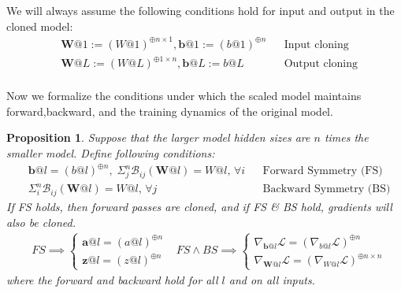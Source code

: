 \documentclass{article}
\newtheorem{proposition}{Proposition}
\newcommand{\1}{\mathbf{1}}
\newcommand{\Loss}{\mathcal{L}}
\newcommand{\R}[2]{\mathcal{R}_{#2}(#1)}
\renewcommand{\R}[2]{({#1})^{\oplus #2}}
\newcommand{\bl}[2]{\mathcal{B}_{#2}({#1})}
\newcommand{\B}[1]{\boldsymbol{#1}}
\begin{document}
We will always assume the following conditions hold for input and output in the cloned model:
\begin{align*}
    &\B W@1:=\R{W@1}{n\times 1},\B b@1:=\R{b@1}{ n} && \text{Input cloning} \\
    &\B W@L:= \R{W@L}{1\times n},\B b@L:=b@L && \text{Output cloning}\\
\end{align*}

Now we formalize the conditions under which the scaled model maintains forward,backward, and the training dynamics of the original model. 

\begin{proposition}\label{prop:cloning_forward_backward} 
    Suppose that the larger model hidden sizes are $n$ times the smaller model. Define following conditions:
    \begin{align*}
    &  \B b@l = \R{b@l}{ n},\; \Sigma_{j}^n\bl{\B W@l}{ij} = W@l,\, \forall i && \text{Forward Symmetry (FS)}\\
    &  \Sigma_{i}^n\bl{\B W@l}{ij} = W@l,\, \forall j  && \text{Backward Symmetry (BS)}
    \end{align*}
    If FS holds, then forward passes are cloned, and if FS \& BS hold, gradients will also be cloned. 
    \begin{align*}
        &FS \implies \begin{cases}
            \B a@l = \R{a@l}{n}\\
            \B z@l=\R{z@l}{n}
        \end{cases} 
        &FS\wedge BS \implies \begin{cases}
            \nabla_{\B b@l}\Loss =\R{\nabla_{b@l}\Loss}{n}\\
            \nabla_{\B W@l}\Loss =\R{\nabla_{W@l}\Loss}{n\times n}
        \end{cases}
    \end{align*}
    where the forward and backward hold for all $l$
and on all inputs.
\end{proposition}
\end{document}
